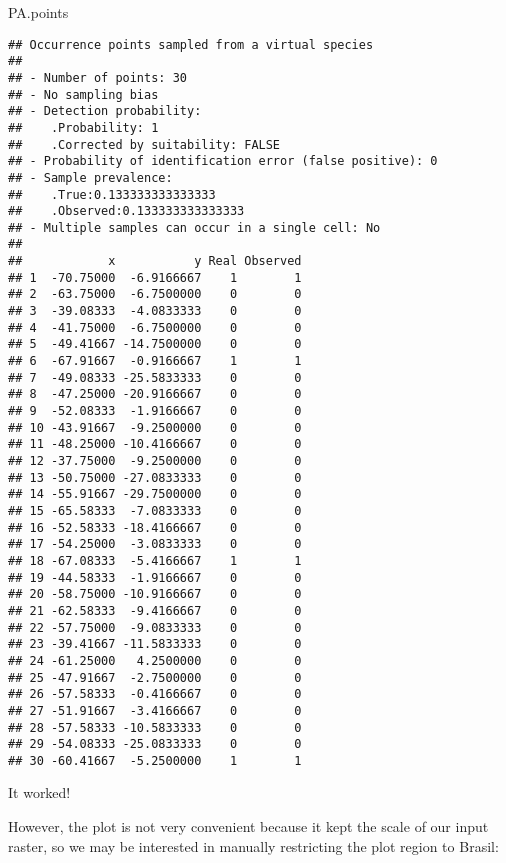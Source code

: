 \documentclass[]{article}
\newenvironment{Shaded}{\begin{snugshade}}{\end{snugshade}}
\newcommand{\NormalTok}[1]{#1}
\begin{document}
\begin{Shaded}
\begin{Highlighting}[]
\NormalTok{PA.points}
\end{Highlighting}
\end{Shaded}

\begin{verbatim}
## Occurrence points sampled from a virtual species
## 
## - Number of points: 30
## - No sampling bias
## - Detection probability: 
##    .Probability: 1
##    .Corrected by suitability: FALSE
## - Probability of identification error (false positive): 0
## - Sample prevalence: 
##    .True:0.133333333333333
##    .Observed:0.133333333333333
## - Multiple samples can occur in a single cell: No
## 
##            x           y Real Observed
## 1  -70.75000  -6.9166667    1        1
## 2  -63.75000  -6.7500000    0        0
## 3  -39.08333  -4.0833333    0        0
## 4  -41.75000  -6.7500000    0        0
## 5  -49.41667 -14.7500000    0        0
## 6  -67.91667  -0.9166667    1        1
## 7  -49.08333 -25.5833333    0        0
## 8  -47.25000 -20.9166667    0        0
## 9  -52.08333  -1.9166667    0        0
## 10 -43.91667  -9.2500000    0        0
## 11 -48.25000 -10.4166667    0        0
## 12 -37.75000  -9.2500000    0        0
## 13 -50.75000 -27.0833333    0        0
## 14 -55.91667 -29.7500000    0        0
## 15 -65.58333  -7.0833333    0        0
## 16 -52.58333 -18.4166667    0        0
## 17 -54.25000  -3.0833333    0        0
## 18 -67.08333  -5.4166667    1        1
## 19 -44.58333  -1.9166667    0        0
## 20 -58.75000 -10.9166667    0        0
## 21 -62.58333  -9.4166667    0        0
## 22 -57.75000  -9.0833333    0        0
## 23 -39.41667 -11.5833333    0        0
## 24 -61.25000   4.2500000    0        0
## 25 -47.91667  -2.7500000    0        0
## 26 -57.58333  -0.4166667    0        0
## 27 -51.91667  -3.4166667    0        0
## 28 -57.58333 -10.5833333    0        0
## 29 -54.08333 -25.0833333    0        0
## 30 -60.41667  -5.2500000    1        1
\end{verbatim}

It worked!

However, the plot is not very convenient because it kept the scale of
our input raster, so we may be interested in manually restricting the
plot region to Brasil:
\end{document}

